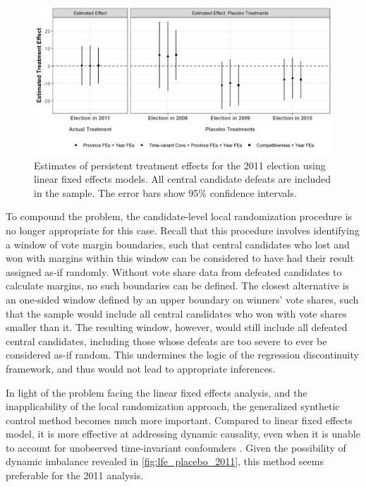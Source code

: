\documentclass[12pt]{article}
\newcommand{\1}{\mathbbm{1}}
\begin{document}
\begin{figure}[!htbp]
	\centering
	\includegraphics[width=\textwidth]{figure/200422_lfe_placebo_2011.png}
	\captionsetup{singlelinecheck=off}
	\caption[Estimated placebo linear fixed effects treatment effects for 2011]{Estimates of persistent treatment effects for the 2011 election using linear fixed effects models. All central candidate defeats are included in the sample. The error bars show 95\% confidence intervals.}
	\label{fig:lfe_placebo_2011}
\end{figure}

To compound the problem, the candidate-level local randomization procedure is no longer appropriate for this case. Recall that this procedure involves identifying a window of vote margin boundaries, such that central candidates who lost and won with margins within this window can be considered to have had their result assigned as-if randomly. Without vote share data from defeated candidates to calculate margins, no such boundaries can be defined. The closest alternative is an one-sided window defined by an upper boundary on winners' vote shares, such that the sample would include all central candidates who won with vote shares smaller than it. The resulting window, however, would still include all defeated central candidates, including those whose defeats are too severe to ever be considered as-if random. This undermines the logic of the regression discontinuity framework, and thus would not lead to appropriate inferences.

In light of the problem facing the linear fixed effects analysis, and the inapplicability of the local randomization approach, the generalized synthetic control method \citep{Xu2017gsynth} becomes much more important. Compared to linear fixed effects model, it is more effective at addressing dynamic causality, even when it is unable to account for unobserved time-invariant confounders \autocite{ImaiKim2019}. Given the possibility of dynamic imbalance revealed in \autoref{fig:lfe_placebo_2011}, this method seems preferable for the 2011 analysis.
\end{document}
